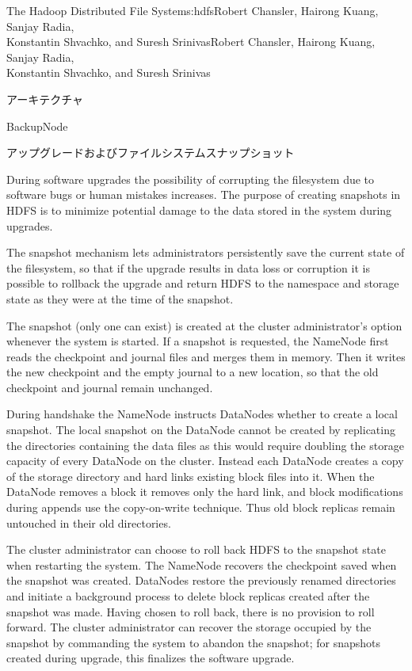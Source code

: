 \begin{aosachaptertoc}{The Hadoop Distributed File System}{s:hdfs}{Robert Chansler, Hairong Kuang, Sanjay Radia, \\ Konstantin Shvachko, and Suresh Srinivas}{Robert Chansler, Hairong Kuang, Sanjay Radia, \\ \hspace*{0.9cm} Konstantin Shvachko, and Suresh Srinivas}
\begin{aosasect1}{アーキテクチャ}
\begin{aosasect2}{BackupNode}
\end{aosasect2}

\begin{aosasect2}{アップグレードおよびファイルシステムスナップショット}

During software upgrades the possibility of corrupting the filesystem
due to software bugs or human mistakes increases. The purpose of
creating snapshots in HDFS is to minimize potential damage to the data
stored in the system during upgrades.

The snapshot mechanism lets administrators persistently save the
current state of the filesystem, so that if the upgrade results in
data loss or corruption it is possible to rollback the upgrade and
return HDFS to the namespace and storage state as they were at the
time of the snapshot.

The snapshot (only one can exist) is created at the cluster
administrator's option whenever the system is started. If a snapshot
is requested, the NameNode first reads the checkpoint and journal
files and merges them in memory. Then it writes the new checkpoint and
the empty journal to a new location, so that the old checkpoint and
journal remain unchanged.

During handshake the NameNode instructs DataNodes whether to create a
local snapshot. The local snapshot on the DataNode cannot be created
by replicating the directories containing the data files as this would require
doubling the storage capacity of every DataNode on the
cluster. Instead each DataNode creates a copy of the storage directory
and hard links existing block files into it. When the DataNode removes
a block it removes only the hard link, and block modifications during
appends use the copy-on-write technique.  Thus old block replicas
remain untouched in their old directories.

The cluster administrator can choose to roll back HDFS to the snapshot
state when restarting the system. The NameNode recovers the checkpoint
saved when the snapshot was created. DataNodes restore the previously
renamed directories and initiate a background process to delete block
replicas created after the snapshot was made. Having chosen to roll
back, there is no provision to roll forward. The cluster administrator
can recover the storage occupied by the snapshot by commanding the
system to abandon the snapshot; for snapshots created during upgrade,
this finalizes the software upgrade.


\end{aosasect2}
\end{aosasect1}
\end{aosachaptertoc}
